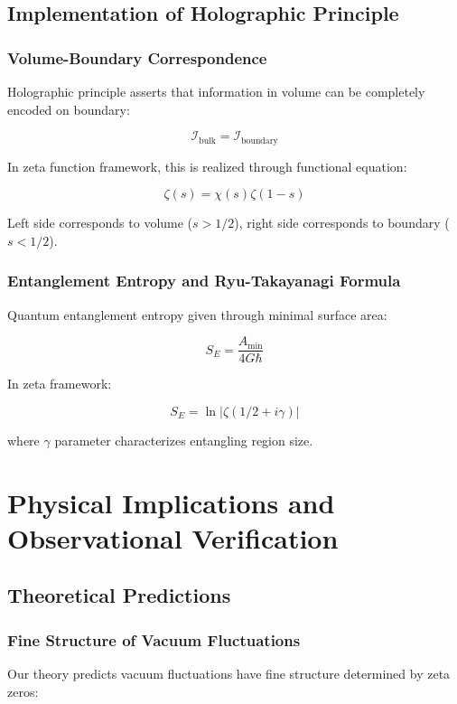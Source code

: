 \documentclass[12pt,a4paper]{article}
\begin{document}
\subsection{Implementation of Holographic Principle}

\subsubsection{Volume-Boundary Correspondence}

Holographic principle asserts that information in volume can be completely encoded on boundary:

$$\mathcal{I}_{\text{bulk}} = \mathcal{I}_{\text{boundary}}$$

In zeta function framework, this is realized through functional equation:

$$\zeta(s) = \chi(s) \zeta(1-s)$$

Left side corresponds to volume ($s > 1/2$), right side corresponds to boundary ($s < 1/2$).

\subsubsection{Entanglement Entropy and Ryu-Takayanagi Formula}

Quantum entanglement entropy given through minimal surface area:

$$S_E = \frac{A_{\min}}{4G\hbar}$$

In zeta framework:

$$S_E = \ln |\zeta(1/2 + i\gamma)|$$

where $\gamma$ parameter characterizes entangling region size.

\section{Physical Implications and Observational Verification}

\subsection{Theoretical Predictions}

\subsubsection{Fine Structure of Vacuum Fluctuations}

Our theory predicts vacuum fluctuations have fine structure determined by zeta zeros:
\end{document}
